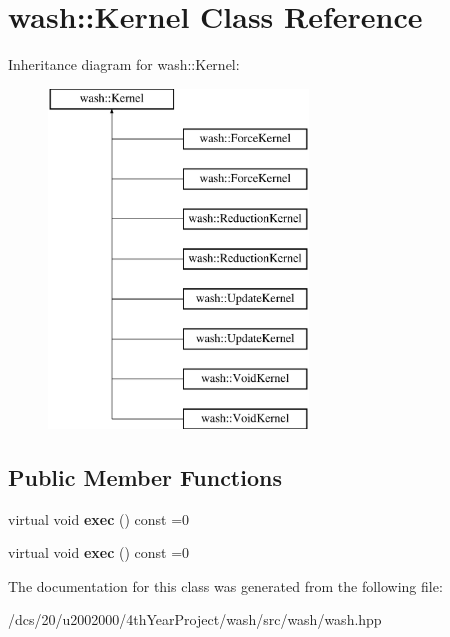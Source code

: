 \hypertarget{classwash_1_1Kernel}{}\section{wash\+:\+:Kernel Class Reference}
\label{classwash_1_1Kernel}
Inheritance diagram for wash\+:\+:Kernel\+:\begin{figure}[H]
\begin{center}
\leavevmode
\includegraphics[height=9.000000cm]{classwash_1_1Kernel}
\end{center}
\end{figure}
\subsection*{Public Member Functions}
\begin{DoxyCompactItemize}
\item 
\mbox{\label{classwash_1_1Kernel_a0ec211840402ce975997b22136f16e39}} 
virtual void {\bfseries exec} () const =0
\item 
\mbox{\label{classwash_1_1Kernel_a0ec211840402ce975997b22136f16e39}} 
virtual void {\bfseries exec} () const =0
\end{DoxyCompactItemize}


The documentation for this class was generated from the following file\+:\begin{DoxyCompactItemize}
\item 
/dcs/20/u2002000/4th\+Year\+Project/wash/src/wash/wash.\+hpp\end{DoxyCompactItemize}
